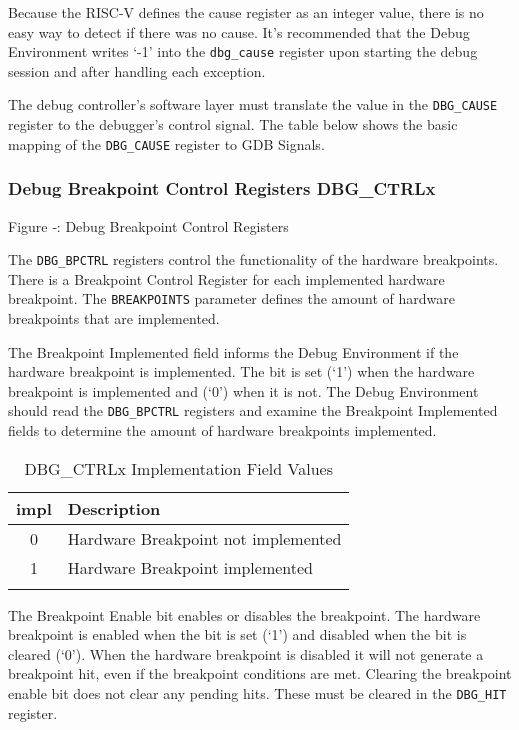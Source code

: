 Because the RISC-V defines the cause register as an integer value, there
is no easy way to detect if there was no cause. It's recommended that
the Debug Environment writes `-1' into the \texttt{dbg\_cause} register upon
starting the debug session and after handling each exception.

The debug controller's software layer must translate the value in the
\texttt{DBG\_CAUSE} register to the debugger's control signal. The table below
shows the basic mapping of the \texttt{DBG\_CAUSE} register to GDB Signals.

\subsubsection{Debug Breakpoint Control Registers
DBG\_CTRLx}\label{debug-breakpoint-control-registers-dbg_ctrlx}

\missingfigure{}

Figure ‑: Debug Breakpoint Control Registers

The \texttt{DBG\_BPCTRL} registers control the functionality of the hardware
breakpoints. There is a Breakpoint Control Register for each implemented
hardware breakpoint. The \texttt{BREAKPOINTS} parameter defines the amount of
hardware breakpoints that are implemented.

The Breakpoint Implemented field informs the Debug Environment if the
hardware breakpoint is implemented. The bit is set (`1') when the
hardware breakpoint is implemented and (`0') when it is not. The Debug
Environment should read the \texttt{DBG\_BPCTRL} registers and examine the
Breakpoint Implemented fields to determine the amount of hardware
breakpoints implemented.

\begin{longtable}[]{@{}cl@{}}
\toprule
impl & Description\tabularnewline
\midrule
\endhead
0 & Hardware Breakpoint not implemented\tabularnewline
1 & Hardware Breakpoint implemented\tabularnewline
\bottomrule
\caption{DBG\_CTRLx Implementation Field Values}
\end{longtable}


The Breakpoint Enable bit enables or disables the breakpoint. The
hardware breakpoint is enabled when the bit is set (`1') and disabled
when the bit is cleared (`0'). When the hardware breakpoint is disabled
it will not generate a breakpoint hit, even if the breakpoint conditions
are met. Clearing the breakpoint enable bit does not clear any pending
hits. These must be cleared in the \texttt{DBG\_HIT} register.

